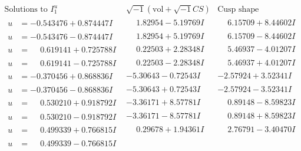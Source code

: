 \documentclass[1p]{elsarticle_modified}
\theoremstyle{definition}
\newcommand{\I}{\sqrt{-1}}
\begin{document}
$$\begin{array}{c|c|c}  
\text{Solutions to }I^u_{1}& \I (\text{vol} + \sqrt{-1}CS) & \text{Cusp shape}\\
 \hline 
\begin{aligned}
u &= -0.543476 + 0.874447 I\end{aligned}
 & \phantom{-}1.82954 - 5.19769 I & \phantom{-}6.15709 + 8.44602 I \\ \hline\begin{aligned}
u &= -0.543476 - 0.874447 I\end{aligned}
 & \phantom{-}1.82954 + 5.19769 I & \phantom{-}6.15709 - 8.44602 I \\ \hline\begin{aligned}
u &= \phantom{-}0.619141 + 0.725788 I\end{aligned}
 & \phantom{-}0.22503 + 2.28348 I & \phantom{-}5.46937 - 4.01207 I \\ \hline\begin{aligned}
u &= \phantom{-}0.619141 - 0.725788 I\end{aligned}
 & \phantom{-}0.22503 - 2.28348 I & \phantom{-}5.46937 + 4.01207 I \\ \hline\begin{aligned}
u &= -0.370456 + 0.868836 I\end{aligned}
 & -5.30643 - 0.72543 I & -2.57924 + 3.52341 I \\ \hline\begin{aligned}
u &= -0.370456 - 0.868836 I\end{aligned}
 & -5.30643 + 0.72543 I & -2.57924 - 3.52341 I \\ \hline\begin{aligned}
u &= \phantom{-}0.530210 + 0.918792 I\end{aligned}
 & -3.36171 + 8.57781 I & \phantom{-}0.89148 - 8.59823 I \\ \hline\begin{aligned}
u &= \phantom{-}0.530210 - 0.918792 I\end{aligned}
 & -3.36171 - 8.57781 I & \phantom{-}0.89148 + 8.59823 I \\ \hline\begin{aligned}
u &= \phantom{-}0.499339 + 0.766815 I\end{aligned}
 & \phantom{-}0.29678 + 1.94361 I & \phantom{-}2.76791 - 3.40470 I \\ \hline\begin{aligned}
u &= \phantom{-}0.499339 - 0.766815 I\end{aligned}

\end{array}$$
\end{document}
